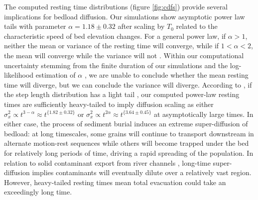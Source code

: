 \documentclass[draft]{agujournal2018}
\begin{document}
The computed resting time distributions (figure \ref{fig:cdfs}) provide several implications for bedload diffusion.
Our simulations show asymptotic power law tails with parameter $\alpha = 1.18 \pm 0.32$ after scaling by $T_0$ related to the characteristic speed of bed elevation changes.
For a general power law, if $\alpha>1$, neither the mean or variance of the resting time will converge, while if $1<\alpha <2$, the mean will converge while the variance will not \citep[e.g.][]{Bradley2017}.
Within our computational uncertainty stemming from the finite duration of our simulations and the log-likelihood estimation of $\alpha$ \citep[e.g.][]{Newman2005}, we are unable to conclude whether the mean resting time will diverge, but we can conclude the variance will diverge.
According to \citet{Weeks1998}, if the step length distribution has a light tail \citep[e.g.][]{Hassan2013}, our computed power-law resting times are sufficiently heavy-tailed to imply diffusion scaling as either $\sigma_x^2 \propto t^{3-\alpha} \approx t^{\{1.82 \pm 0.32 \}}$ or $\sigma_x^2 \propto t^{2\alpha} \approx t^{\{3.64\pm 0.45\}}$ at asymptotically large times.
In either case, the process of sediment burial induces an extreme super-diffusion of bedload: at long timescales, some grains will continue to transport downstream in alternate motion-rest sequences while others will become trapped under the bed for relatively long periods of time, driving a rapid spreading of the population.
In relation to solid contaminant export from river channels \citep[e.g.][]{Malmon2005}, long-time super-diffusion implies contaminants will eventually dilute over a relatively vast region. However, heavy-tailed resting times mean total evacuation could take an exceedingly long time.
\end{document}
